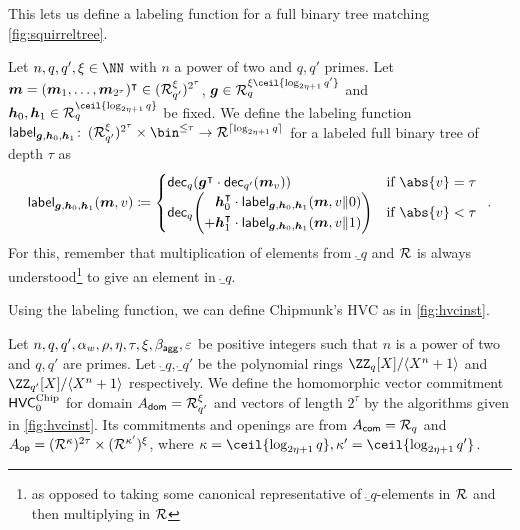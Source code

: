 This lets us define a labeling function for a full binary tree matching \autoref{fig:squirreltree}.


\begin{definition}\label{def:label}
  Let $n,q,q',\xi\in\NN$ with $n$ a power of two and $q,q'$ primes.
  Let $\boldsymbol{m}=(\boldsymbol{m}_{1},\dots,\boldsymbol{m}_{{2^{\tau}}})^\intercal\in(\mathcal{R}_{q'}^\xi)^{2^{\tau}}$, $\vec{g} \in \ring_{q}^{\xi\ceil{\log_{2\eta+1} q'}}$ and $\vec{h}_0,\vec{h}_1 \in \ring_q^{\ceil{\log_{2\eta+1} q}}$ be fixed.
  We define the labeling function
  $\lbl_{\vec{g},\vec{h}_0,\vec{h}_1}\colon\,
  (\ring^\xi_{q'})^{2^{\tau}}\times \bin^{\leq \tau} \to \ring^{\lceil \log_{2\eta+1} q \rceil}$
  for a labeled full binary tree of depth $\tau$ as
  \[
    \lbl_{\vec{g},\vec{h}_0,\vec{h}_1}(\vec{m},v) \coloneqq 
      \begin{cases}
          \decompmod{q}(\vec{g}^\transpose\cdot \decompmod{q'}(\vec{m}_{v})) & \text{if } \abs{v}=\tau\\ \decompmod{q}\mleft(
              \begin{aligned}
                 \vec{h}_0^\transpose \cdot\lbl_{\vec{g},\vec{h}_0,\vec{h}_1}(\vec{m},v\Vert 0)\\
               + \vec{h}_1^\transpose \cdot\lbl_{\vec{g},\vec{h}_0,\vec{h}_1}(\vec{m},v\Vert 1)
               \end{aligned}
              \mright)& \text{if } \abs{v}< \tau
      \end{cases}\enspace.
  \]
For this, remember that multiplication of elements from $\ring_q$ and $\mathcal{R}$ is always understood\footnote{as opposed to taking some canonical representative of $\ring_q$-elements in $\mathcal{R}$ and then multiplying in $\mathcal{R}$} to give an element in $\ring_q$.
\end{definition}

Using the labeling function, we can define Chipmunk's HVC as in \autoref{fig:hvcinst}.

\begin{definition}\label{def:hvc_chipmunk_unencoded}
Let $n, q, q', \alpha_w, \rho, \eta, \tau, \xi,\beta_{\mathsf{agg}}, \varepsilon$ be positive integers such that $n$ is a power of two and $q,q'$ are primes.
Let $\ring_q,\ring_{q'}$ be the polynomial rings $\defringq$ and $\defringqq$ respectively.
We define the homomorphic vector commitment $\mathsf{HVC}^{\textup{Chip}}_{0}$ for domain $A_{\mathsf{dom}} = \mathcal{R}_{q'}^\xi$ and vectors of length $2^\tau$ by the algorithms given in \autoref{fig:hvcinst}.
Its commitments and openings are from $A_{\mathsf{com}} = \mathcal{R}_q$ and $A_{\mathsf{op}} = (\mathcal{R}^\kappa)^{2\tau}\times (\mathcal{R}^{\kappa'})^{\xi}$, where $\limbs = \ceil{\log_{2\eta+1}q}, \limbs' = \ceil{\log_{2\eta+1}q'}$.
\end{definition}


